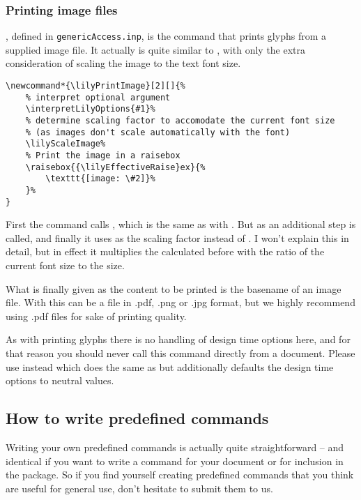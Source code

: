 \documentclass{article}
\begin{document}
\subsubsection{Printing image files}
\label{subsubsec:printing_image_files}
, defined in \texttt{genericAccess.inp}, is the command that prints glyphs from a supplied image file.
It actually is quite similar to , with only the extra consideration of scaling the image to the text font size.

\begin{verbatim}
\newcommand*{\lilyPrintImage}[2][]{%
    % interpret optional argument
    \interpretLilyOptions{#1}%
    % determine scaling factor to accomodate the current font size 
    % (as images don't scale automatically with the font)
    \lilyScaleImage%
    % Print the image in a raisebox
    \raisebox{{\lilyEffectiveRaise}ex}{%
        \texttt{[image: \#2]}%
    }%
}
\end{verbatim}
First the command calls , which is the same as with .
But as an additional step  is called, and finally it uses  as the scaling factor instead of .
I won't explain this in detail, but in effect it multiplies the  calculated before with the ratio of the current font size to the  size.

What is finally given as the content to be printed is the basename of an image file.
With \XeLaTeX this can be a file in .pdf, .png or .jpg format, but we highly recommend using .pdf files for sake of printing quality.

As with printing \emmentaler glyphs there is no handling of design time options here, and for that reason you should never call this command directly from a document.
Please use  instead which does the same as  but additionally defaults the design time options to neutral values.

\subsection{How to write predefined commands}
\label{subsec:howto_predefined_commands}
Writing your own predefined commands is actually quite straightforward -- and identical if you want to write a command for your document or for inclusion in the package.
So if you find yourself creating predefined commands that you think are useful for general use, don't hesitate to submit them to us. 
\end{document}
